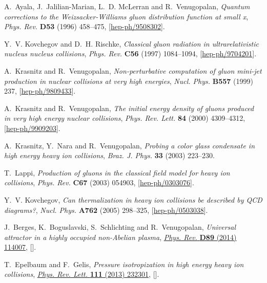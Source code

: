 \documentclass[onecolumn,showpacs,nobibnotes,nofootinbib,12pt,aps,prd,showpacs,notitlepage,nofootinbib,preprintnumbers,amsmath,amssymb]{article}
\begin{document}
\begin{thebibliography}{10}
A.~Ayala, J.~Jalilian-Marian, L.~D. McLerran and R.~Venugopalan, \emph{Quantum
  corrections to the {Weizsacker-Williams} gluon distribution function at small
  x}, {\emph{Phys. Rev.} {\bfseries D53} (1996) 458--475},
  [\href{https://arxiv.org/abs/hep-ph/9508302}{{\ttfamily hep-ph/9508302}}].

Y.~V. Kovchegov and D.~H. Rischke, \emph{Classical gluon radiation in
  ultrarelativistic nucleus nucleus collisions}, {\emph{Phys. Rev.} {\bfseries
  C56} (1997) 1084--1094},
  [\href{https://arxiv.org/abs/hep-ph/9704201}{{\ttfamily hep-ph/9704201}}].

A.~Krasnitz and R.~Venugopalan, \emph{Non-perturbative computation of gluon
  mini-jet production in nuclear collisions at very high energies},
  {\emph{Nucl. Phys.} {\bfseries B557} (1999) 237},
  [\href{https://arxiv.org/abs/hep-ph/9809433}{{\ttfamily hep-ph/9809433}}].

A.~Krasnitz and R.~Venugopalan, \emph{The initial energy density of gluons
  produced in very high energy nuclear collisions}, {\emph{Phys. Rev. Lett.}
  {\bfseries 84} (2000) 4309--4312},
  [\href{https://arxiv.org/abs/hep-ph/9909203}{{\ttfamily hep-ph/9909203}}].

A.~Krasnitz, Y.~Nara and R.~Venugopalan, \emph{Probing a color glass condensate
  in high energy heavy ion collisions}, {\emph{Braz. J. Phys.} {\bfseries 33}
  (2003) 223--230}.

T.~Lappi, \emph{Production of gluons in the classical field model for heavy ion
  collisions}, {\emph{Phys. Rev.} {\bfseries C67} (2003) 054903},
  [\href{https://arxiv.org/abs/hep-ph/0303076}{{\ttfamily hep-ph/0303076}}].

Y.~V. Kovchegov, \emph{{Can thermalization in heavy ion collisions be described
  by QCD diagrams?}}, {\emph{Nucl. Phys.} {\bfseries A762} (2005) 298--325},
  [\href{https://arxiv.org/abs/hep-ph/0503038}{{\ttfamily hep-ph/0503038}}].

J.~Berges, K.~Boguslavski, S.~Schlichting and R.~Venugopalan, \emph{{Universal
  attractor in a highly occupied non-Abelian plasma}},
  \href{https://doi.org/10.1103/PhysRevD.89.114007}{\emph{Phys. Rev.}
  {\bfseries D89} (2014) 114007},
  [\href{https://arxiv.org/abs/1311.3005}{{}}].

T.~Epelbaum and F.~Gelis, \emph{{Pressure isotropization in high energy heavy
  ion collisions}},
  \href{https://doi.org/10.1103/PhysRevLett.111.232301}{\emph{Phys. Rev. Lett.}
  {\bfseries 111} (2013) 232301},
  [\href{https://arxiv.org/abs/1307.2214}{{}}].


\end{thebibliography}
\end{document}

